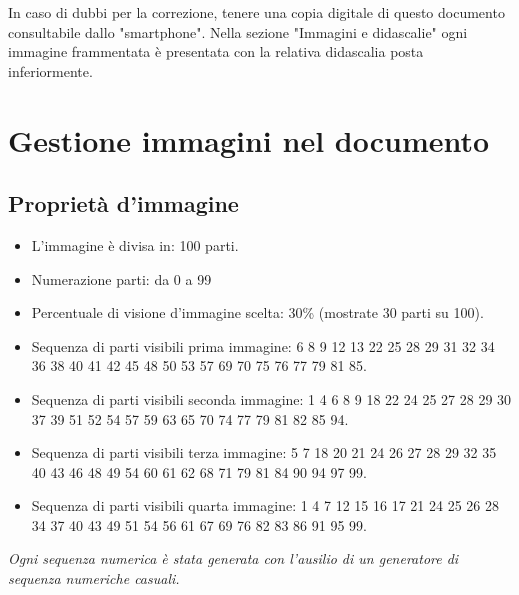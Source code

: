 \documentclass[hidelinks,12pt,a4paper]{article}
\begin{document}
	
	\vspace*{\fill}
	\centering
	\fboxrule=2pt
	\fbox
	{
		\begin{minipage}{\linewidth}
			In caso di dubbi per la correzione, tenere una copia digitale di questo documento consultabile dallo "smartphone". Nella sezione "Immagini e didascalie" ogni immagine frammentata è presentata con la relativa didascalia posta inferiormente.
		\end{minipage}
	}

	\newpage
	\section{Gestione immagini nel documento}
	
	\newline
	
	\subsection{Proprietà d'immagine}
	\begin{itemize}
		\item L'immagine è divisa in: 100 parti.
		\item Numerazione parti: da 0 a 99
		\item Percentuale di visione d'immagine scelta: 30\% (mostrate 30 parti su 100).
		\item Sequenza di parti visibili prima immagine:  6 8 9 12 13 22 25 28 29 31 32 34 36 38 40 41 42 45 48 50 53 57 69 70 75 76 77 79 81 85.
		\item Sequenza di parti visibili seconda immagine:  1 4 6 8 9 18 22 24 25 27 28 29 30 37 39 51 52 54 57 59 63 65 70 74 77 79 81 82 85 94.
		\item Sequenza di parti visibili terza immagine:  5 7 18 20 21 24 26 27 28 29 32 35 40 43 46 48 49 54 60 61 62 68 71 79 81 84 90 94 97 99.
		\item Sequenza di parti visibili quarta immagine:  1 4 7 12 15 16 17 21 24 25 26 28 34 37 40 43 49 51 54 56 61 67 69 76 82 83 86 91 95 99.
	\end{itemize}
	\textit{Ogni sequenza numerica è stata generata con l'ausilio di un generatore di sequenza numeriche casuali.}
\end{document}
